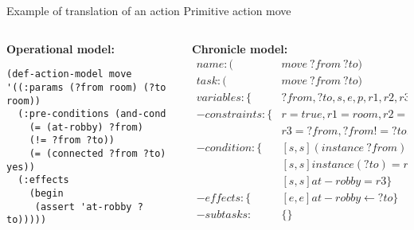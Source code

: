 \begin{frame}[fragile]{Example of translation of an action}
Primitive action move
\begin{columns}[T] %
\begin{column}{.48\textwidth}
\small
\textbf{Operational model:}
\tiny
\begin{lstlisting}
(def-action-model move
'((:params (?from room) (?to room))
  (:pre-conditions (and-cond 
    (= (at-robby) ?from)
    (!= ?from ?to))
    (= (connected ?from ?to) yes))
  (:effects
    (begin
     (assert 'at-robby ?to)))))
\end{lstlisting}
\end{column}%
\hfill%
\begin{column}{.48\textwidth}
\small
\textbf{Chronicle model:}
\tiny
\begin{align*}
name :(&move\ ?from\ ?to)\\
task :(&move\ ?from\ ?to)\\
variables: \{&?from, ?to, s, e, p, r1,r2,r3,r\}\\
-constraints: \{&r = true, r1 = room, r2 = room\\
	& r3 = ?from, ?from != ?to, s < e \}\\
-condition:\{&[s,s] (instance\ ?from) = r1 \\
	&[s,s] instance(?to) = r2\\
	&[s,s] at-robby = r3 \}\\
 -effects:\{&[e,e] at-robby \leftarrow ?to\} \\
 -subtasks:& \{\}
\end{align*}
\end{column}%
\end{columns}
\end{frame}